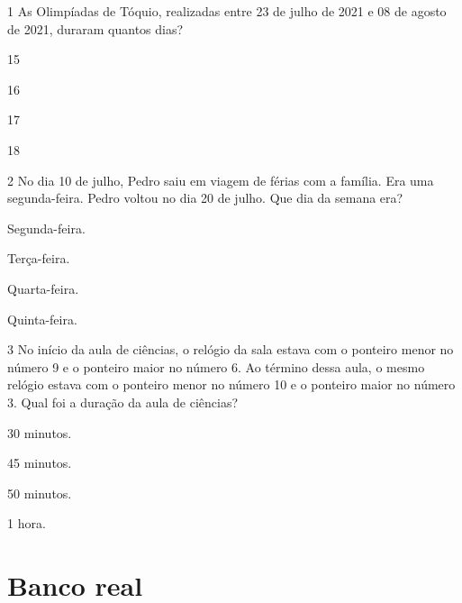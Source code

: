 \num{1} As Olimpíadas de Tóquio, realizadas entre 23 de julho de 2021 e 08 de
agosto de 2021, duraram quantos dias?

\begin{escolha}[itemsep=-5pt]
\item 15

\item 16

\item 17

\item 18
\end{escolha}

\num{2} No dia 10 de julho, Pedro saiu em viagem de férias com a família. Era
uma segunda-feira. Pedro voltou no dia 20 de julho. Que dia da semana
era?

\begin{escolha}[itemsep=-5pt]
\item Segunda-feira.

\item Terça-feira.

\item Quarta-feira.

\item Quinta-feira.
\end{escolha}

\num{3} No início da aula de ciências, o relógio da sala estava com o ponteiro
menor no número 9 e o ponteiro maior no número 6. Ao término dessa
aula, o mesmo relógio estava com o ponteiro menor no número
10 e o ponteiro maior no número 3. Qual foi a duração da aula de
ciências?

\begin{escolha}[itemsep=-5pt]
\item 30 minutos.

\item 45 minutos.

\item 50 minutos.

\item 1 hora.
\end{escolha}

\chapter{Banco real}


